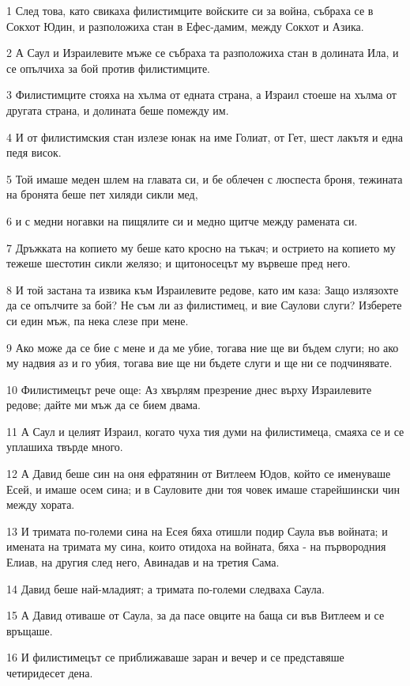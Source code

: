 \par 1 След това, като свикаха филистимците войските си за война, събраха се в Сокхот Юдин, и разположиха стан в Ефес-дамим, между Сокхот и Азика.
\par 2 А Саул и Израилевите мъже се събраха та разположиха стан в долината Ила, и се опълчиха за бой против филистимците.
\par 3 Филистимците стояха на хълма от едната страна, а Израил стоеше на хълма от другата страна, и долината беше помежду им.
\par 4 И от филистимския стан излезе юнак на име Голиат, от Гет, шест лакътя и една педя висок.
\par 5 Той имаше меден шлем на главата си, и бе облечен с люспеста броня, тежината на бронята беше пет хиляди сикли мед,
\par 6 и с медни ногавки на пищялите си и медно щитче между рамената си.
\par 7 Дръжката на копието му беше като кросно на тъкач; и острието на копието му тежеше шестотин сикли желязо; и щитоносецът му вървеше пред него.
\par 8 И той застана та извика към Израилевите редове, като им каза: Защо излязохте да се опълчите за бой? Не съм ли аз филистимец, и вие Саулови слуги? Изберете си един мъж, па нека слезе при мене.
\par 9 Ако може да се бие с мене и да ме убие, тогава ние ще ви бъдем слуги; но ако му надвия аз и го убия, тогава вие ще ни бъдете слуги и ще ни се подчинявате.
\par 10 Филистимецът рече още: Аз хвърлям презрение днес върху Израилевите редове; дайте ми мъж да се бием двама.
\par 11 А Саул и целият Израил, когато чуха тия думи на филистимеца, смаяха се и се уплашиха твърде много.
\par 12 А Давид беше син на оня ефратянин от Витлеем Юдов, който се именуваше Есей, и имаше осем сина; и в Сауловите дни тоя човек имаше старейшински чин между хората.
\par 13 И тримата по-големи сина на Есея бяха отишли подир Саула във войната; и имената на тримата му сина, които отидоха на войната, бяха - на първородния Елиав, на другия след него, Авинадав и на третия Сама.
\par 14 Давид беше най-младият; а тримата по-големи следваха Саула.
\par 15 А Давид отиваше от Саула, за да пасе овците на баща си във Витлеем и се връщаше.
\par 16 И филистимецът се приближаваше заран и вечер и се представяше четиридесет дена.
